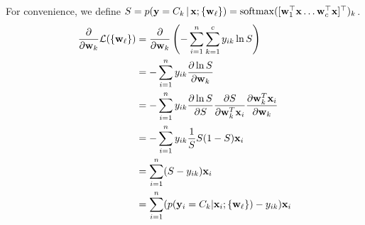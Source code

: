 \documentclass[submit]{harvardml}
\begin{document}
\begin{solution}
\begin{sol}
\begin{enumerate}
For convenience, we define $S = p(\mathbf{y}=C_k \,|\, \mathbf{x}; \{\mathbf{w}_{\ell}\}) = \mathrm{softmax}([\mathbf{w}_1^{\top}\mathbf{x} \ldots \mathbf{w}_c^{\top} \mathbf{x}]^\top)_k$.
\begin{align*}
\frac{\partial }{\partial \mathbf{w}_k} \mathcal{L}(\{\mathbf{w}_{\ell}\}) &= \frac{\partial }{\partial \mathbf{w}_k} \left( - \sum_{i=1}^n \sum_{k=1}^c y_{ik} \ln S \right)\\
&= - \sum_{i=1}^n y_{ik} \frac{\partial \ln S}{\partial \mathbf{w}_k}\\
&= - \sum_{i=1}^n y_{ik} \frac{\partial \ln S}{\partial S} \frac{\partial S}{\partial \mathbf{w}_k^T\mathbf{x}_i} \frac{\partial \mathbf{w}_k^T\mathbf{x}_i}{\partial \mathbf{w}_k}\\
&= - \sum_{i=1}^n y_{ik} \frac{1}{S} S(1 - S) \mathbf{x}_i\\
&= \sum_{i=1}^n (S - y_{ik}) \mathbf{x}_i\\
&= \sum_{i=1}^n (p(\mathbf{y}_i = C_k | \mathbf{x}_i; \{\mathbf{w}_\ell\}) - y_{ik} ) \mathbf{x}_i
\end{align*}

\end{enumerate}
\end{sol}
\end{solution}
\end{document}
